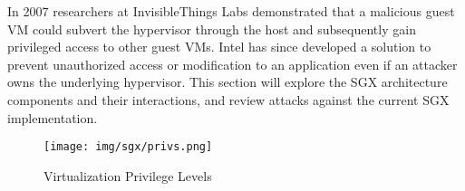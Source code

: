 


	
	
	In 2007 researchers at InvisibleThings Labs\cite{Rutkowska_Tereshkin_2007} demonstrated that a malicious guest VM could subvert the hypervisor through the host and subsequently gain privileged access to other guest VMs. Intel has since developed a solution to prevent unauthorized access or modification to an application even if an attacker owns the underlying hypervisor. This section will explore the SGX architecture components and their interactions, and review attacks against the current SGX implementation. 
	
\begin{figure}
\centering
\texttt{[image: img/sgx/privs.png]}
\caption{Virtualization Privilege Levels \cite{Shriraman_Dwarkadas_2010}}
\end{figure}

